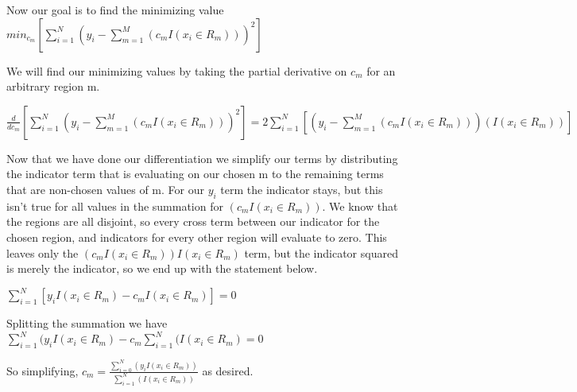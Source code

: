 \documentclass[11pt]{article}
\begin{document}
\vspace{3 mm}
\noindent
Now our goal is to find the minimizing value 
$min_{c_{m}}[\sum\limits_{i=1}^N (y_{i} - 
\sum\limits_{m=1}^M (c_{m}I(x_{i} \in R_{m})))^2]$ 

\vspace{3 mm}
\noindent
We will find our minimizing values by taking the partial derivative on $c_{m}$ 
for an arbitrary region m.

\vspace{3 mm}
\noindent
$\frac{d}{dc_{m}}[\sum\limits_{i=1}^N (y_{i} - 
\sum\limits_{m=1}^M (c_{m}I(x_{i} \in R_{m})))^2] = 
2\sum\limits_{i=1}^N [(y_{i} - \sum\limits_{m=1}^M (c_{m}I(x_{i} \in R_{m})))
(I(x_{i} \in R_{m}))]$ 

\vspace{3 mm}
\noindent
Now that we have done our differentiation we simplify our terms by distributing 
the indicator term that is evaluating on our chosen m to the remaining terms 
that are non-chosen values of m. For our $y_{i}$ term the indicator stays, but 
this isn't true for all values in the summation for 
$(c_{m}I(x_{i} \in R_{m}))$.  We know that the regions are all disjoint, so 
every cross term between our indicator for the chosen region, and indicators 
for every other region will evaluate to zero.  This leaves only the 
$(c_{m}I(x_{i} \in R_{m}))I(x_{i} \in R_{m})$ term, but the indicator squared 
is merely the indicator, so we end up with the statement below.

\vspace{3 mm}
\noindent
$\sum\limits_{i=1}^N [y_{i}I(x_{i} \in R_{m}) - c_{m}I(x_{i} \in R_{m})] = 0$ 

\vspace{3 mm}
\noindent
Splitting the summation we have 
$\sum\limits_{i=1}^N (y_{i}I(x_{i} \in R_{m}) - 
c_{m}\sum\limits_{i=1}^N (I(x_{i} \in R_{m}) = 0$

\vspace{3 mm}
\noindent
So simplifying, 
${c}_{m} = \frac{\sum\limits_{i=0}^N (y_{i} I(x_{i} \in R_{m}))}
{\sum\limits_{i=1}^N (I(x_{i} \in R_{m}))}$ 
as desired.

\newpage
\begin{center}
\ \\
\end{center}
\end{document}
